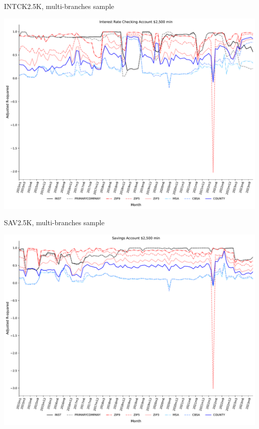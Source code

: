 \documentclass{beamer}
\begin{document}
\begin{frame}{INTCK2.5K, multi-branches sample}
\begin{center}
\includegraphics[width=1\textwidth]{figure/multi_branch_sample_932466/all_fixed_effects/INTCK2_5K_adjusted_R2_all_fixed_effects.pdf} 
\end{center}
\end{frame}



\begin{frame}{SAV2.5K, multi-branches sample}
\begin{center}
\includegraphics[width=1\textwidth]{figure/multi_branch_sample_932466/all_fixed_effects/SAV2_5K_adjusted_R2_all_fixed_effects.pdf} 
\end{center}
\end{frame}
\end{document}
